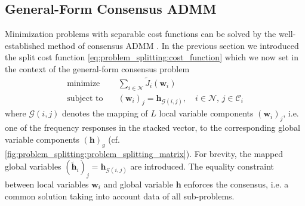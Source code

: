 \documentclass{article}
\newcommand{\hf}{{\bm{h}}}
\newcommand{\wf}{{\bm{w}}}
\newcommand{\Cset}{\mathcal{C}}
\newcommand{\Nset}{\mathcal{N}}
\begin{document}
\subsection{General-Form Consensus ADMM}
\label{ssec:general_consensus_admm}
Minimization problems with separable cost functions can be solved by the well-established method of consensus ADMM \cite{boydDistributedOptimizationStatistical2011}.
In the previous section we introduced the split cost function \eqref{eq:problem_splitting:cost_function} which we now set in the context of the general-form consensus problem
\begin{align}
    \operatorname{minimize} \quad &\sum_{i \in \Nset} \tilde{J}_i(\wf_i)\\
    \text{subject to} \quad &(\wf_i)_j = \hf_{\mathcal{G}(i,j)},\quad i \in \Nset,\,j \in \Cset_i
\end{align}
where \(\mathcal{G}(i,j)\) denotes the mapping of \(L\) local variable components \((\wf_i)_j\), i.e. one of the frequency responses in the stacked vector, to the corresponding global variable components \((\hf)_g\) (cf. \autoref{fig:problem_splitting:problem_splitting_matrix}).
For brevity, the mapped global variables \((\tilde{\hf}_i)_j = \hf_{\mathcal{G}(i,j)}\) are introduced.
The equality constraint between local variables \(\wf_i\) and global variable \(\hf\) enforces the consensus, i.e. a common solution taking into account data of all sub-problems.
\end{document}
